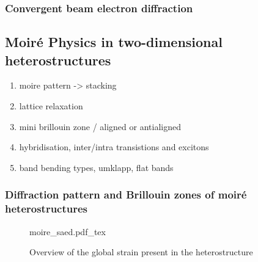 \subsubsection{Convergent beam electron diffraction}



\subsection{Moiré Physics in two-dimensional heterostructures}
\begin{enumerate}
    \item moire pattern -> stacking
    \item lattice relaxation
    \item mini brillouin zone / aligned or antialigned
    \item hybridisation, inter/intra transistions and excitons
    \item band bending types, umklapp,  flat bands
\end{enumerate}

\subsubsection{Diffraction pattern and Brillouin zones of moiré heterostructures}


\begin{figure}[h]
    \centering
    \def\svgwidth{1\linewidth}
    {moire_saed.pdf_tex}
    \caption{Overview of the global strain present in the heterostructure}
    \label{fig:moire_saed}
\end{figure}



